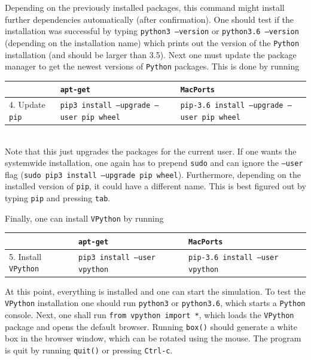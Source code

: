 \documentclass[12pt,ngerman,american]{iopart}
\newcommand{\python}[0]{\texttt{Python}}
\newcommand{\vpython}[0]{\texttt{VPython}}
\newcommand{\code}[1]{{\scriptsize\colorbox{light-gray}{\texttt{#1}}}}
\begin{document}
Depending on the previously installed packages, this command might install further dependencies automatically (after confirmation).
One should test if the installation was successful by typing \code{python3 --version} or \code{python3.6 --version} (depending on the installation name) which prints out the version of the \python{} installation (and should be larger than 3.5).
Next one must update the package manager to get the newest versions of \python{} packages.
This is done by running
\begin{table}[h!]
\centering
\footnotesize
\begin{tabular}{l || l | l}
	& \texttt{apt-get} & \texttt{MacPorts} \\\hline
	4. Update \code{pip} & \code{pip3 install --upgrade --user pip wheel} & \code{pip-3.6 install --upgrade --user pip wheel} \\
\end{tabular}
\normalsize
\end{table}\\
Note that this just upgrades the packages for the current user.
If one wants the systemwide installation, one again has to prepend \code{sudo} and can ignore the \code{--user} flag (\code{sudo pip3 install --upgrade pip wheel}).
Furthermore, depending on the installed version of \code{pip}, it could have a different name.
This is best figured out by typing \code{pip} and pressing \texttt{tab}.

Finally, one can install \vpython{} by running
\begin{table}[h!]
\centering
\footnotesize
\begin{tabular}{l || l | l}
	& \texttt{apt-get} & \texttt{MacPorts} \\\hline
	5. Install \vpython{} & \code{pip3 install --user vpython} & \code{pip-3.6 install --user vpython} \\
\end{tabular}
\normalsize
\end{table}

At this point, everything is installed and one can start the simulation.
To test the \vpython{} installation one should run \code{python3} or \code{python3.6}, which starts a \python{} console.
Next, one shall run \code{from vpython import *}, which loads the \vpython{} package and opens the default browser.
Running \code{box()} should generate a white box in the browser window, which can be rotated using the mouse.
The program is quit by running \code{quit()} or pressing \texttt{Ctrl-c}.
\end{document}
